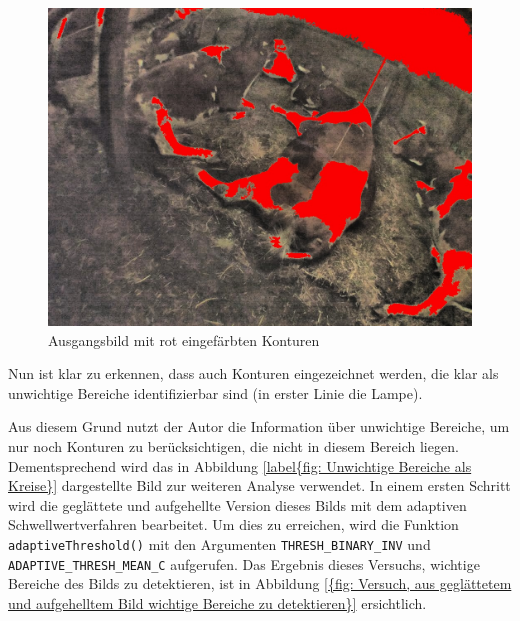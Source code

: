 \begin{figure}[H]
	\center
	\includegraphics[scale=0.43]{Grafiken/entwicklung/9thresholdedImage.jpg}
	\caption{Ausgangsbild mit rot eingefärbten Konturen} 
	\label{fig: Ausgangsbild mit rot eingefärbten Konturen} 
\end{figure}

Nun ist klar zu erkennen, dass auch Konturen eingezeichnet werden, die klar als unwichtige Bereiche identifizierbar sind (in erster Linie die Lampe).

Aus diesem Grund nutzt der Autor die Information über unwichtige Bereiche, um nur noch Konturen zu berücksichtigen, die nicht in diesem Bereich liegen. Dementsprechend wird das in Abbildung \ref{label{fig: Unwichtige Bereiche als Kreise}} dargestellte Bild zur weiteren Analyse verwendet. In einem ersten Schritt wird die geglättete und aufgehellte Version dieses Bilds mit dem adaptiven Schwellwertverfahren bearbeitet. Um dies zu erreichen, wird die Funktion \texttt{adaptiveThreshold()} mit den Argumenten \texttt{THRESH_BINARY_INV} und \texttt{ADAPTIVE_THRESH_MEAN_C} aufgerufen. Das Ergebnis dieses Versuchs, wichtige Bereiche des Bilds zu detektieren, ist in Abbildung \ref{{fig: Versuch, aus geglättetem und aufgehelltem Bild wichtige Bereiche zu detektieren}} ersichtlich. 

